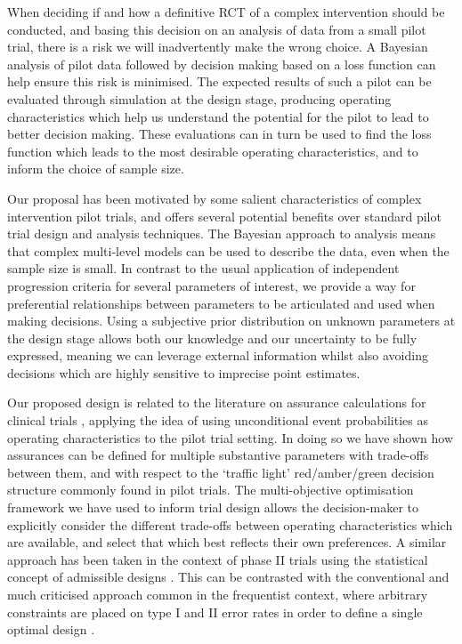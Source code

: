 \documentclass[AMA,STIX1COL]{WileyNJD-v2}
\begin{document}


When deciding if and how a definitive RCT of a complex intervention should be conducted, and basing this decision on an analysis of data from a small pilot trial, there is a risk we will inadvertently make the wrong choice. A Bayesian analysis of pilot data followed by decision making based on a loss function can help ensure this risk is minimised. The expected results of such a pilot can be evaluated through simulation at the design stage, producing operating characteristics which help us understand the potential for the pilot to lead to better decision making. These evaluations can in turn be used to find the loss function which leads to the most desirable operating characteristics, and to inform the choice of sample size.

Our proposal has been motivated by some salient characteristics of complex intervention pilot trials, and offers several potential benefits over standard pilot trial design and analysis techniques. The Bayesian approach to analysis means that complex multi-level models can be used to describe the data, even when the sample size is small. In contrast to the usual application of independent progression criteria for several parameters of interest, we provide a way for preferential relationships between parameters to be articulated and used when making decisions. Using a subjective prior distribution on unknown parameters at the design stage allows both our knowledge and our uncertainty to be fully expressed, meaning we can leverage external  information whilst also avoiding decisions which are highly sensitive to imprecise point estimates.

Our proposed design is related to the literature on assurance calculations for clinical trials \cite{OHagan2005}, applying the idea of using unconditional event probabilities as operating characteristics to the pilot trial setting. In doing so we have shown how assurances can be defined for multiple substantive parameters with trade-offs between them, and with respect to the `traffic light' red/amber/green decision structure commonly found in pilot trials. The multi-objective optimisation framework we have used to inform trial design allows the decision-maker to explicitly consider the different trade-offs between operating characteristics which are available, and select that which best reflects their own preferences. A similar approach has been taken in the context of phase II trials using the statistical concept of admissible designs \cite{Jung2004, Mander2012}. This can be contrasted with the conventional and much criticised approach common in the frequentist context, where arbitrary constraints are placed on type I and II error rates in order to define a single optimal design \cite{Bacchetti2010}.
\end{document}
